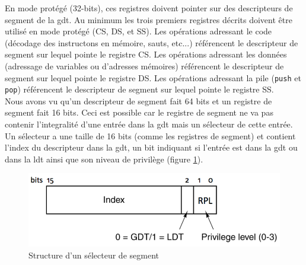 \documentclass[a4paper, 12pt]{article}
\begin{document}
\begin{center}
\end{center}

En mode protégé (32-bits), ces registres doivent pointer sur des descripteurs
de segment de la \acrshort{gdt}. Au minimum les trois premiers registres décrits
doivent être utilisé en mode protégé (CS, DS, et SS). Les opérations adressant le
code (décodage des instructons en mémoire, sauts, etc...) référencent le descripteur
de segment sur lequel pointe le registre CS. Les opérations adressant les données
(adressage de variables ou d'adresses mémoires) référencent le descripteur de segment
sur lequel pointe le registre DS. Les opérations adressant la pile (\texttt{push}
et \texttt{pop}) référencent le descripteur de segment sur lequel pointe
le registre SS. \\

Nous avons vu qu'un descripteur de segment fait 64 bits et un registre de segment
fait 16 bits. Ceci est possible car le registre de segment ne va pas contenir
l'integralité d'une entrée dans la \acrshort{gdt} mais un sélecteur de cette entrée.
Un sélecteur a une taille de 16 bits (comme les registres de segment) et contient
l'index du descripteur dans la \acrshort{gdt}, un bit indiquant si l'entrée est
dans la \acrshort{gdt} ou dans la \acrshort{ldt} ainsi que son niveau de privilège
(figure \ref{seg_sel}).\cite{ref42}

\begin{figure}[!h]
  \centering
  \includegraphics[scale=0.75]{images/seg_sel.png}
  \caption{Structure d'un sélecteur de segment}
  \label{seg_sel}
\end{figure}
\end{document}
